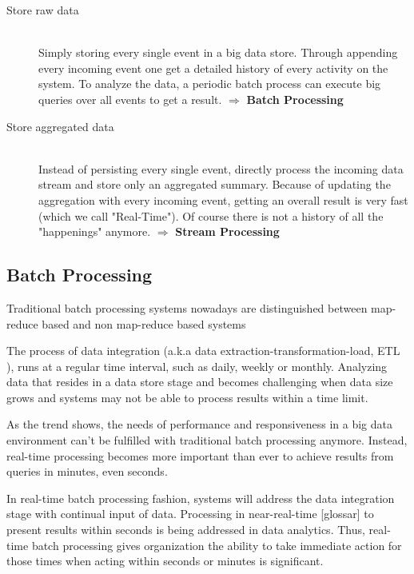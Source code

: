 \begin{description}
    \item[Store raw data]  \hfill \\
    {Simply storing every single event in a big data store. Through appending
    every incoming event one get a detailed history of every activity on the system.
    To analyze the data, a periodic batch process can execute big queries over
    all events to get a result.  $ \Rightarrow $  \textbf{Batch Processing}}
    \item[Store aggregated data  ] \hfill \\
    {Instead of persisting every single event, directly process the incoming data stream and store
    only an aggregated summary. Because of updating the aggregation with every
    incoming event, getting an overall result is very fast (which we call
    "Real-Time"). Of course there is not a history of all the "happenings"
    anymore. $ \Rightarrow $ \textbf{Stream Processing}} 
\end{description}
\cite{TalkKleppmann}


\subsection{Batch Processing}
\label{intro-datastream-batchprocessing}
Traditional batch processing systems nowadays are distinguished between
map-reduce based and non map-reduce based systems 

The process of  data integration (a.k.a data extraction-transformation-load, ETL
), runs at a regular time interval, such as daily, weekly or
monthly. Analyzing data that resides in a data store stage and becomes
challenging when data size grows and systems may not be able to process results
within a time limit. \cite{Liu:2014:SRP:2628194.2628251}

As the trend shows, the needs of performance and responsiveness in a big data
environment can't be fulfilled with traditional batch processing anymore.
Instead, real-time processing becomes more important than ever to achieve
results from queries in minutes, even seconds. 
\cite{bange2013big}

In real-time batch processing fashion, systems will address the data integration stage
with continual input of data. Processing in near-real-time [glossar] to present 
results within seconds is being addressed in data analytics. Thus,
real-time batch processing gives organization the ability to take immediate action
for those times when acting within seconds or minutes is significant.
\cite{PrpSvyOfDSPS}


